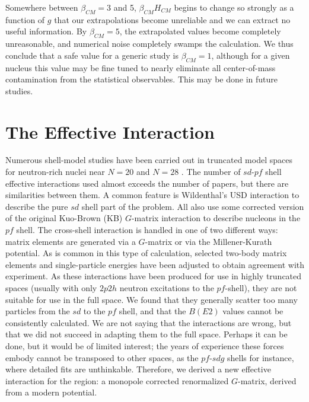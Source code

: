 \begin{multicols}{2}
Somewhere between $\beta_{CM}= 3$ and 5, $\beta_{CM} H_{CM}$ begins to
change so strongly as a function of $g$ that our extrapolations become
unreliable and we can extract no useful information.  By
$\beta_{CM}=5$, the extrapolated values become completely
unreasonable, and numerical noise completely swamps the calculation.
We thus conclude that a safe value for a generic study is
$\beta_{CM}=1$, although for a given nucleus this value may be fine
tuned to nearly eliminate all center-of-mass contamination from the
statistical observables. This may be done in future studies.

\section{The Effective Interaction}

Numerous shell-model studies have been carried out in truncated model
spaces for neutron-rich nuclei near $N = 20$
\cite{r:wbmb,r:fukunishi,r:poves1} and $N = 28$
\cite{r:brown1,r:brown2,r:retamosa}.  The number of $sd$-$pf$ shell
effective interactions used almost exceeds the number of papers, but
there are similarities between them. A common feature is Wildenthal's
USD interaction \cite{r:wildenthal} to describe the pure $sd$ shell
part of the problem.  All also use some corrected version of the
original Kuo-Brown (KB) $G$-matrix interaction \cite{KB} to describe
nucleons in the $pf$ shell.  The cross-shell interaction is handled in
one of two different ways: matrix elements are generated via a
$G$-matrix or via the Millener-Kurath potential.  As is common in
this type of calculation, selected two-body matrix elements and single-particle
energies have been adjusted to obtain agreement with
experiment. As these interactions have been produced for use in highly
truncated spaces (usually with only $2p2h$ neutron excitations to the
$pf$-shell), they are not suitable for use in the full space. We found
that they generally scatter too many particles from the $sd$ to the
$pf$ shell, and that the $B(E2)$ values cannot be consistently
calculated. We are not saying that the interactions are wrong, but
that we did not succeed in adapting them to the full space.
Perhaps it can be
done, but it would be of limited interest; the years of experience
these forces embody cannot be transposed to other spaces, as the
$pf$-$sdg$ shells for instance, where detailed fits are unthinkable.
Therefore, we derived a new effective interaction for the region: a
monopole corrected renormalized $G$-matrix, derived from a modern
potential.


\end{multicols}
